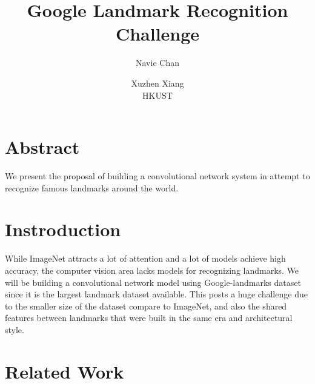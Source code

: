 \documentclass[10pt,twocolumn,letterpaper]{article}
\begin{document}
\title{Google Landmark Recognition Challenge}  %

\author{Navie Chan\\
\and
Xuzhen Xiang\\
HKUST\\
}

\maketitle
\thispagestyle{empty}


\section{Abstract}
We present the proposal of building a convolutional network system in attempt to recognize famous landmarks around the world.


\section{Instroduction}
While ImageNet attracts a lot of attention and a lot of models achieve high accuracy, the computer vision area lacks models for recognizing landmarks. We will be building a convolutional network model using Google-landmarks dataset since it is the largest landmark dataset available. This posts a huge challenge due to the smaller size of the dataset compare to ImageNet\cite{ILSVRC15}, and also the shared features between landmarks that were built in the same era and architectural style. 

\section{Related Work}
\end{document}
